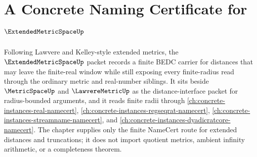 \chapter{A Concrete Naming Certificate for $\ExtendedMetricSpaceUp$}
\label{ch:concrete-instances-extended-metric-space-namecert}

Following Lawvere and Kelley-style extended metrics, the $\ExtendedMetricSpaceUp$ packet records a finite BEDC carrier for distances that may leave the finite-real window while still exposing every finite-radius read through the ordinary metric and real-number siblings. It sits beside $\MetricSpaceUp$ and $\LawvereMetricUp$ as the distance-interface packet for radius-bounded arguments, and it reads finite radii through \autoref{ch:concrete-instances-real-namecert}, \autoref{ch:concrete-instances-regseqrat-namecert}, \autoref{ch:concrete-instances-streamname-namecert}, and \autoref{ch:concrete-instances-dyadicratcore-namecert}. The chapter supplies only the finite NameCert route for extended distances and truncations; it does not import quotient metrics, ambient infinity arithmetic, or a completeness theorem.

